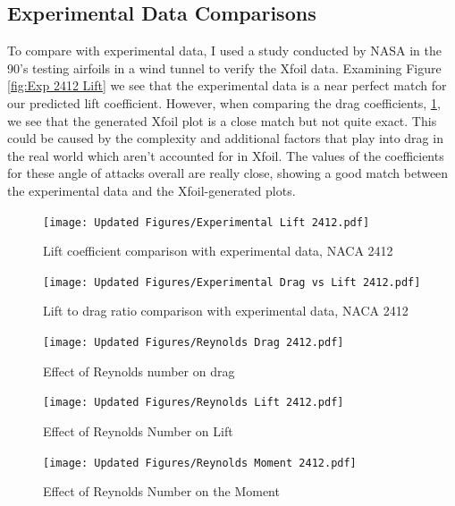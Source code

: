\documentclass{article}
\begin{document}
\subsection{Experimental Data Comparisons}

To compare with experimental data, I used a study conducted by NASA \cite{anderson1994simplified} in the 90's testing airfoils in a wind tunnel to verify the Xfoil data. Examining Figure \ref{fig:Exp 2412 Lift} we see that the experimental data is a near perfect match for our predicted lift coefficient. However, when comparing the drag coefficients, \ref{fig:Exp 2412 Drag}, we see that the generated Xfoil plot is a close match but not quite exact. This could be caused by the complexity and additional factors that play into drag in the real world which aren't accounted for in Xfoil. The values of the coefficients for these angle of attacks overall are really close, showing a good match between the experimental data and the Xfoil-generated plots.

\begin{figure}[h]
    \centering
\begin{minipage}[b]{0.45\textwidth}
\centering
\texttt{[image: Updated Figures/Experimental Lift 2412.pdf]}
\caption{\label{fig:Exp 2412 Lift}Lift coefficient comparison with experimental data, NACA 2412}
\end{minipage}
\begin{minipage}[b]{0.45\textwidth}
\centering
\texttt{[image: Updated Figures/Experimental Drag vs Lift 2412.pdf]}
\caption{\label{fig:Exp 2412 Drag}Lift to drag ratio comparison with experimental data, NACA 2412}
\end{minipage}
\end{figure}

\begin{figure}[h]
    \centering
\begin{minipage}[b]{0.45\textwidth}
\centering
\texttt{[image: Updated Figures/Reynolds Drag 2412.pdf]}
\caption{Effect of Reynolds number on drag}
\label{fig:Reynolds Drag}
\end{minipage}
\begin{minipage}[b]{0.45\textwidth}
\centering
\texttt{[image: Updated Figures/Reynolds Lift 2412.pdf]}
\caption{Effect of Reynolds Number on Lift}
\label{fig:Reynolds Lift}
\end{minipage}
\end{figure}

\begin{figure}
    \centering
    \texttt{[image: Updated Figures/Reynolds Moment 2412.pdf]}
    \caption{Effect of Reynolds Number on the Moment}
    \label{fig:Moment Reynolds}
\end{figure}
\end{document}
